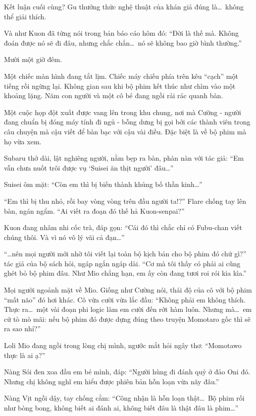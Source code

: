 \documentclass[../main.tex]{subfiles}
\begin{document}
Kết luận cuối cùng? Gu thưởng thức nghệ thuật của khán giả đúng là\dots\ không thể giải thích.

Và như Kuon đã từng nói trong bản báo cáo hôm đó: ``Đời là thế mà. Không đoán được nó sẽ đi đâu, nhưng chắc chắn\dots\ nó sẽ không bao giờ bình thường.''

\ct

Mười một giờ đêm.

Một chiếc màn hình đang tắt lịm. Chiếc máy chiếu phía trên kêu ``cạch'' một tiếng rồi ngừng lại. Không gian sau khi bộ phim kết thúc như chìm vào một khoảng lặng. Năm con người và một cô bé đang ngồi rải rác quanh bàn.

Một cuộc họp đột xuất được vang lên trong khu chung, nơi mà Cường - người đang chuẩn bị đóng máy tính đi ngủ - bỗng dưng bị gọi bởi các thành viên trong câu chuyện mà cậu viết để bàn bạc với cậu vài điều. Đặc biệt là về bộ phim mà họ vừa xem.

Subaru thở dài, lật nghiêng người, nằm bẹp ra bàn, phàn nàn với tác giả: ``Em vẫn chưa nuốt trôi được vụ `Suisei ăn thịt người' đâu\dots''

Suisei ôm mặt: ``Còn em thì bị biến thành khủng bố thần kinh\dots''

``Em thì bị thu nhỏ, rồi bay vòng vòng trên đầu người ta!?'' Flare chống tay lên bàn, ngán ngẩm. ``Ai viết ra đoạn đó thế hả Kuon-senpai?''

Kuon đang nhâm nhi cốc trà, đáp gọn: ``Cái đó thì chắc chỉ có Fubu-chan viết chúng thôi. Và vì nó vô lý vãi cả đạn\dots''

``\dots nên mọi người mới nhờ tôi viết lại toàn bộ kịch bản cho bộ phim đó chứ gì?'' tác giả của bộ sách hỏi, ngáp ngắn ngáp dài. ``Cơ mà tôi thấy có phải ai cũng ghét bỏ bộ phim đâu. Như Mio chẳng hạn, em ấy còn đang tươi roi rói kia kìa.''

Mọi người ngoảnh mặt về Mio. Giống như Cường nói, thái độ của cô với bộ phim ``mất não'' đó hơi khác. Cô vừa cười vừa lắc đầu: ``Không phải em không thích. Thực ra\dots\ một vài đoạn phi logic làm em cười đến rớt hàm luôn. Nhưng mà\dots\ em cứ tò mò mãi: nếu bộ phim đó được dựng đúng theo truyện Momotaro gốc thì sẽ ra sao nhỉ?''

Loli Mio đang ngồi trong lòng chị mình, ngước mắt hỏi ngây thơ: ``Momotawo thực là ai ạ?''

Nàng Sói đen xoa đầu em bé mình, đáp: ``Người hùng đi đánh quỷ ở đảo Oni đó. Nhưng chị không nghĩ em hiểu được phiên bản hỗn loạn vừa nãy đâu.''

Nàng Vịt ngồi dậy, tay chống cằm: ``Công nhận là hỗn loạn thật\dots\ Bộ phim rối như bòng bong, không biết ai đánh ai, không biết đâu là thật đâu là phim\dots''
\end{document}
